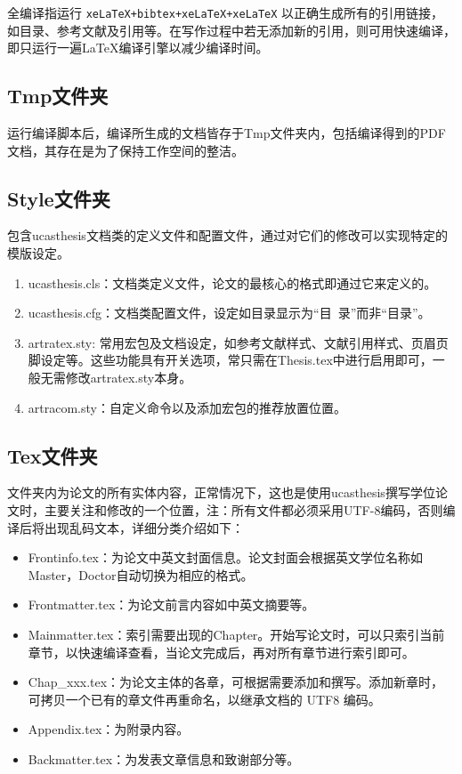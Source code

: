 {全编译指运行 \verb|xeLaTeX+bibtex+xeLaTeX+xeLaTeX| 以正确生成所有的引用链接，如目录、参考文献及引用等。在写作过程中若无添加新的引用，则可用快速编译，即只运行一遍LaTeX编译引擎以减少编译时间。

\subsection{Tmp文件夹}

运行编译脚本后，编译所生成的文档皆存于Tmp文件夹内，包括编译得到的PDF文档，其存在是为了保持工作空间的整洁。

\subsection{Style文件夹}

包含ucasthesis文档类的定义文件和配置文件，通过对它们的修改可以实现特定的模版设定。

\begin{enumerate}
    \item ucasthesis.cls：文档类定义文件，论文的最核心的格式即通过它来定义的。
    \item ucasthesis.cfg：文档类配置文件，设定如目录显示为“目~录”而非“目录”。
    \item artratex.sty: 常用宏包及文档设定，如参考文献样式、文献引用样式、页眉页脚设定等。这些功能具有开关选项，常只需在Thesis.tex中进行启用即可，一般无需修改artratex.sty本身。
    \item artracom.sty：自定义命令以及添加宏包的推荐放置位置。
\end{enumerate}

\subsection{Tex文件夹}

文件夹内为论文的所有实体内容，正常情况下，这也是使用ucasthesis撰写学位论文时，主要关注和修改的一个位置，注：所有文件都必须采用UTF-8编码，否则编译后将出现乱码文本，详细分类介绍如下：

\begin{itemize}
    \item Frontinfo.tex：为论文中英文封面信息。论文封面会根据英文学位名称如Master，Doctor自动切换为相应的格式。
    \item Frontmatter.tex：为论文前言内容如中英文摘要等。
    \item Mainmatter.tex：索引需要出现的Chapter。开始写论文时，可以只索引当前章节，以快速编译查看，当论文完成后，再对所有章节进行索引即可。
    \item Chap{\_}xxx.tex：为论文主体的各章，可根据需要添加和撰写。添加新章时，可拷贝一个已有的章文件再重命名，以继承文档的 UTF8 编码。
    \item Appendix.tex：为附录内容。
    \item Backmatter.tex：为发表文章信息和致谢部分等。
\end{itemize}

}
